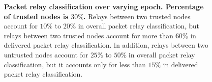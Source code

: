 \documentclass[11pt]{article}
\begin{document}
\begin{figure}[h!]
{\label{fig:delivered_relay_classification_epoch_1}
}
\hfill
{}

\caption{{\bf Packet relay classification over varying epoch. Percentage of trusted nodes is $30\%$.}
Relays between two trusted nodes account for $10\%$ to $20\%$ in overall packet relay classification,
but relays between two trusted nodes account for more than $60\%$ in delivered packet relay classification.
In addition, relays between two untrusted nodes account for $25\%$ to $50\%$ in overall packet relay classification, 
but it accounts only for less than $15\%$ in delivered packet relay classification. 
}
\label{fig:relay_classification_epoch}
\end{figure}
\end{document}
